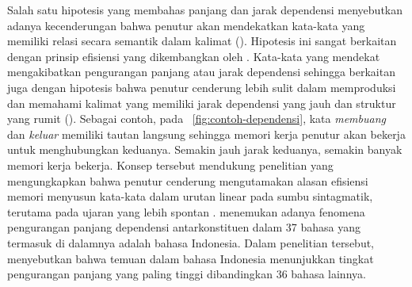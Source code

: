 Salah satu hipotesis yang membahas panjang dan jarak dependensi menyebutkan adanya kecenderungan bahwa penutur akan mendekatkan kata-kata yang memiliki relasi secara semantik dalam kalimat (\citealp{futrell2015large, liu2017dependency}). Hipotesis ini sangat berkaitan dengan prinsip efisiensi yang dikembangkan oleh \cite{hawkins2004efficiency}. Kata-kata yang mendekat mengakibatkan pengurangan panjang atau jarak dependensi sehingga berkaitan juga dengan hipotesis bahwa penutur cenderung lebih sulit dalam memproduksi dan memahami kalimat yang memiliki jarak dependensi yang jauh dan struktur yang rumit (\citealp{hawkins2004efficiency, dillon2011structured}). Sebagai contoh, pada \pic~\ref{fig:contoh-dependensi}, kata \textit{membuang} dan \textit{keluar} memiliki tautan langsung sehingga memori kerja penutur akan bekerja untuk menghubungkan keduanya. Semakin jauh jarak keduanya, semakin banyak memori kerja bekerja. Konsep tersebut mendukung penelitian \cite{jaeger2006redundancy} yang mengungkapkan bahwa penutur cenderung mengutamakan alasan efisiensi memori menyusun kata-kata dalam urutan linear pada sumbu sintagmatik, terutama pada ujaran yang lebih spontan \citep{jaeger2006redundancy}. \cite{futrell2015large} menemukan adanya fenomena pengurangan panjang dependensi antarkonstituen dalam 37 bahasa yang termasuk di dalamnya adalah bahasa Indonesia. Dalam penelitian tersebut, \cite{futrell2015large} menyebutkan bahwa temuan dalam bahasa Indonesia menunjukkan tingkat pengurangan panjang yang paling tinggi dibandingkan 36 bahasa lainnya. 

